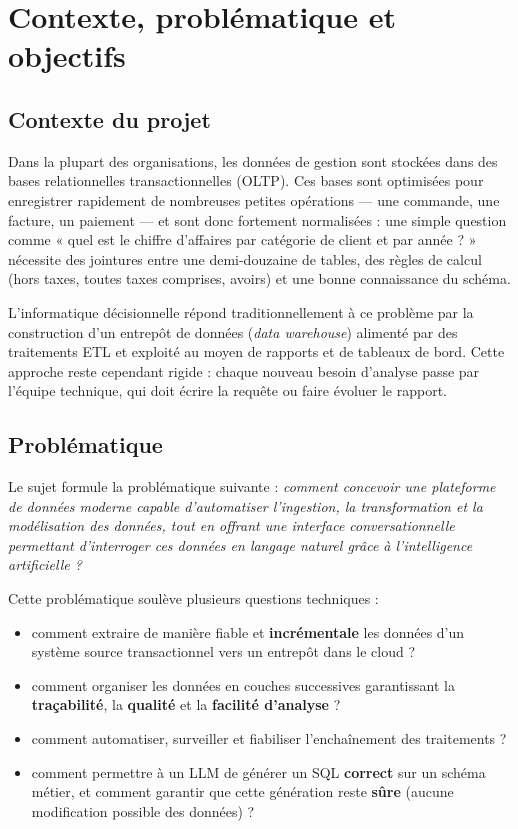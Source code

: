 \chapter{Contexte, problématique et objectifs}
\label{ch:contexte}

\section{Contexte du projet}

Dans la plupart des organisations, les données de gestion sont stockées dans des bases relationnelles
transactionnelles (OLTP). Ces bases sont optimisées pour enregistrer rapidement de nombreuses petites
opérations --- une commande, une facture, un paiement --- et sont donc fortement normalisées : une simple
question comme « quel est le chiffre d'affaires par catégorie de client et par année ? » nécessite des
jointures entre une demi-douzaine de tables, des règles de calcul (hors taxes, toutes taxes comprises,
avoirs) et une bonne connaissance du schéma.

L'informatique décisionnelle répond traditionnellement à ce problème par la construction d'un entrepôt de
données (\emph{data warehouse}) alimenté par des traitements ETL et exploité au moyen de rapports et de
tableaux de bord. Cette approche reste cependant rigide : chaque nouveau besoin d'analyse passe par
l'équipe technique, qui doit écrire la requête ou faire évoluer le rapport.

\section{Problématique}

Le sujet formule la problématique suivante : \emph{comment concevoir une plateforme de données moderne
capable d'automatiser l'ingestion, la transformation et la modélisation des données, tout en offrant une
interface conversationnelle permettant d'interroger ces données en langage naturel grâce à
l'intelligence artificielle ?}

Cette problématique soulève plusieurs questions techniques :
\begin{itemize}
  \item comment extraire de manière fiable et \textbf{incrémentale} les données d'un système source
        transactionnel vers un entrepôt dans le cloud ?
  \item comment organiser les données en couches successives garantissant la \textbf{traçabilité}, la
        \textbf{qualité} et la \textbf{facilité d'analyse} ?
  \item comment automatiser, surveiller et fiabiliser l'enchaînement des traitements ?
  \item comment permettre à un LLM de générer un SQL \textbf{correct} sur un schéma métier, et comment
        garantir que cette génération reste \textbf{sûre} (aucune modification possible des données) ?
\end{itemize}

